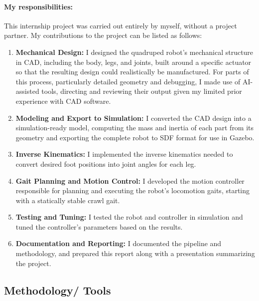 \documentclass[12pt]{article}
\begin{document}
\paragraph{My responsibilities:} This internship project was carried out entirely by myself, without a project partner. My contributions to the project can be listed as follows:

\begin{enumerate}
    \item \textbf{Mechanical Design:} I designed the quadruped robot's mechanical structure in CAD, including the body, legs, and joints, built around a specific actuator so that the resulting design could realistically be manufactured. For parts of this process, particularly detailed geometry and debugging, I made use of AI-assisted tools, directing and reviewing their output given my limited prior experience with CAD software.
    \item \textbf{Modeling and Export to Simulation:} I converted the CAD design into a simulation-ready model, computing the mass and inertia of each part from its geometry and exporting the complete robot to SDF format for use in Gazebo.
    \item \textbf{Inverse Kinematics:} I implemented the inverse kinematics needed to convert desired foot positions into joint angles for each leg.
    \item \textbf{Gait Planning and Motion Control:} I developed the motion controller responsible for planning and executing the robot's locomotion gaits, starting with a statically stable crawl gait.
    \item \textbf{Testing and Tuning:} I tested the robot and controller in simulation and tuned the controller's parameters based on the results.
    \item \textbf{Documentation and Reporting:} I documented the pipeline and methodology, and prepared this report along with a presentation summarizing the project.
\end{enumerate}

\subsection{Methodology/ Tools}
\label{subsec:methodology}
\end{document}

